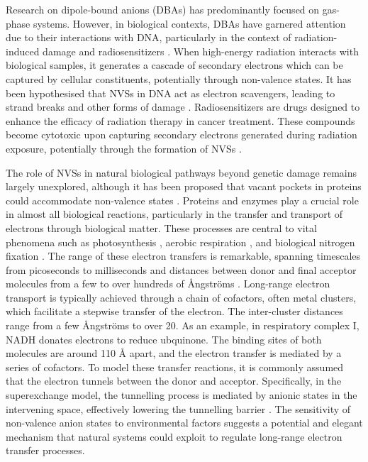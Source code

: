 Research on dipole-bound anions (DBAs) has predominantly focused on gas-phase systems. However, in biological contexts, DBAs have garnered attention due to their interactions with DNA, particularly in the context of radiation-induced damage and radiosensitizers \cite{gu2012interactions,narayanan2023secondary,sedmidubska2024interaction}.
When high-energy radiation interacts with biological samples, it generates a cascade of secondary electrons which can be captured by cellular constituents, potentially through non-valence states. It has been hypothesised that NVSs in DNA act as electron scavengers, leading to strand breaks and other forms of damage \cite{gu2012interactions,narayanan2023secondary,narayanan2024electron,sommerfeld2005dipole}.
Radiosensitizers are drugs designed to enhance the efficacy of radiation therapy in cancer treatment. These compounds become cytotoxic upon capturing secondary electrons generated during radiation exposure, potentially through the formation of NVSs \cite{sedmidubska2024interaction}.

The role of NVSs in natural biological pathways beyond genetic damage remains largely unexplored, although it has been proposed that vacant pockets in proteins could accommodate non-valence states \cite{castellani2019stability}. Proteins and enzymes play a crucial role in almost all biological reactions, particularly in the transfer and transport of electrons through biological matter. These processes are central to vital phenomena such as photosynthesis \cite{mitchell1961coupling}, aerobic respiration \cite{wikstrom1977proton}, and biological nitrogen fixation \cite{rutledge2020electron}. The range of these electron transfers is remarkable, spanning timescales from picoseconds to milliseconds and distances between donor and final acceptor molecules from a few to over hundreds of \r{A}ngstr{\"o}ms \cite{gray1996electron,blumberger2015recent}. Long-range electron transport is typically achieved through a chain of cofactors, often metal clusters, which facilitate a stepwise transfer of the electron. The inter-cluster distances range from a few \r{A}ngstr{\"o}ms to over 20. As an example, in respiratory complex I, NADH donates electrons to reduce ubquinone\cite{ernster1995biochemical}. The binding sites of both molecules are around 110 \r{A} apart, and the electron transfer is mediated by a series of cofactors. To model these transfer reactions, it is commonly assumed that the electron tunnels between the donor and acceptor. Specifically, in the superexchange model, the tunnelling process is mediated by anionic states in the intervening space, effectively lowering the tunnelling barrier \cite{blumberger2015recent}. The sensitivity of non-valence anion states to environmental factors suggests a potential and elegant mechanism that natural systems could exploit to regulate long-range electron transfer processes. %

